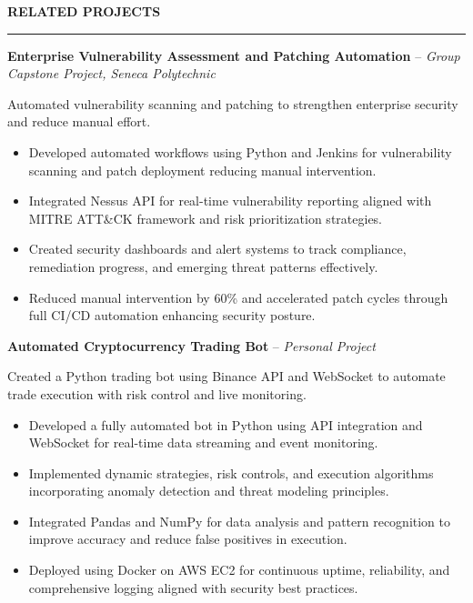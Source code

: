 \documentclass[10pt,letterpaper]{article}
\begin{document}
\vspace{6pt}

\textbf{RELATED PROJECTS}\\[-8pt]
\noindent\rule{\textwidth}{1pt}

\vspace{-2pt}

\textbf{Enterprise Vulnerability Assessment and Patching Automation} -- \emph{Group Capstone Project, Seneca Polytechnic }

\vspace{-1pt}

Automated vulnerability scanning and patching to strengthen enterprise security and reduce manual effort.
\vspace{-1pt}
\begin{itemize}
\item Developed automated workflows using Python and Jenkins for vulnerability scanning and patch deployment reducing manual intervention.
\item Integrated Nessus API for real-time vulnerability reporting aligned with MITRE ATT\&CK framework and risk prioritization strategies.
\item Created security dashboards and alert systems to track compliance, remediation progress, and emerging threat patterns effectively.
\item Reduced manual intervention by 60\% and accelerated patch cycles through full CI/CD automation enhancing security posture.
\end{itemize}

\textbf{Automated Cryptocurrency Trading Bot} -- \emph{Personal Project}

\vspace{-1pt}

Created a Python trading bot using Binance API and WebSocket to automate trade execution with risk control and live monitoring.
\vspace{-1pt}
\begin{itemize}
\item Developed a fully automated bot in Python using API integration and WebSocket for real-time data streaming and event monitoring.
\item Implemented dynamic strategies, risk controls, and execution algorithms incorporating anomaly detection and threat modeling principles.
\item Integrated Pandas and NumPy for data analysis and pattern recognition to improve accuracy and reduce false positives in execution.
\item Deployed using Docker on AWS EC2 for continuous uptime, reliability, and comprehensive logging aligned with security best practices.
\end{itemize}
\end{document}
